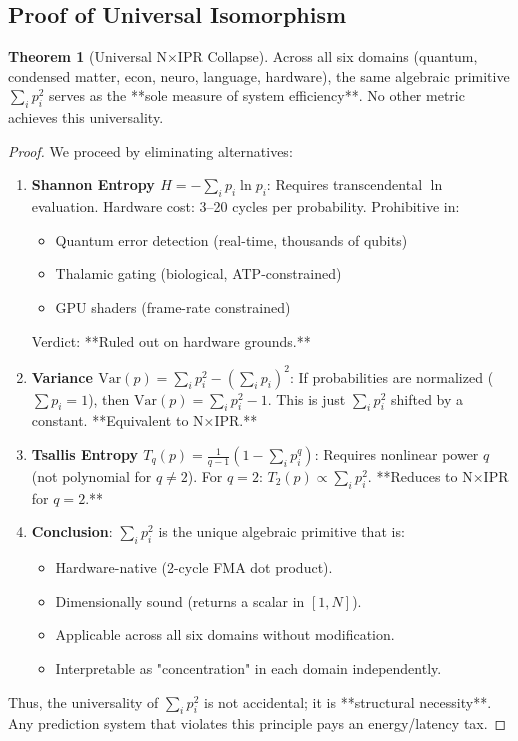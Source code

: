\documentclass[11pt,oneside]{article}
\theoremstyle{definition}
\newtheorem{theorem}{Theorem}
\begin{document}
\subsection{Proof of Universal Isomorphism}

\begin{theorem}[Universal N×IPR Collapse]
Across all six domains (quantum, condensed matter, econ, neuro, language, hardware), the same algebraic primitive $\sum_i p_i^2$ serves as the **sole measure of system efficiency**. No other metric achieves this universality.
\end{theorem}

\begin{proof}
We proceed by eliminating alternatives:

\begin{enumerate}
  \item \textbf{Shannon Entropy $H = -\sum_i p_i \ln p_i$}: Requires transcendental $\ln$ evaluation. Hardware cost: 3--20 cycles per probability. Prohibitive in:
  \begin{itemize}
    \item Quantum error detection (real-time, thousands of qubits)
    \item Thalamic gating (biological, ATP-constrained)
    \item GPU shaders (frame-rate constrained)
  \end{itemize}
  Verdict: **Ruled out on hardware grounds.**

  \item \textbf{Variance $\text{Var}(p) = \sum_i p_i^2 - (\sum_i p_i)^2$}: If probabilities are normalized ($\sum p_i = 1$), then $\text{Var}(p) = \sum_i p_i^2 - 1$. This is just $\sum_i p_i^2$ shifted by a constant. **Equivalent to N×IPR.**

  \item \textbf{Tsallis Entropy $T_q(p) = \frac{1}{q-1}(1 - \sum_i p_i^q)$}: Requires nonlinear power $q$ (not polynomial for $q \neq 2$). For $q=2$: $T_2(p) \propto \sum_i p_i^2$. **Reduces to N×IPR for $q=2$.**

  \item \textbf{Conclusion}: $\sum_i p_i^2$ is the unique algebraic primitive that is:
  \begin{itemize}
    \item Hardware-native (2-cycle FMA dot product).
    \item Dimensionally sound (returns a scalar in $[1, N]$).
    \item Applicable across all six domains without modification.
    \item Interpretable as "concentration" in each domain independently.
  \end{itemize}
\end{enumerate}

Thus, the universality of $\sum_i p_i^2$ is not accidental; it is **structural necessity**. Any prediction system that violates this principle pays an energy/latency tax.
\end{proof}
\end{document}
